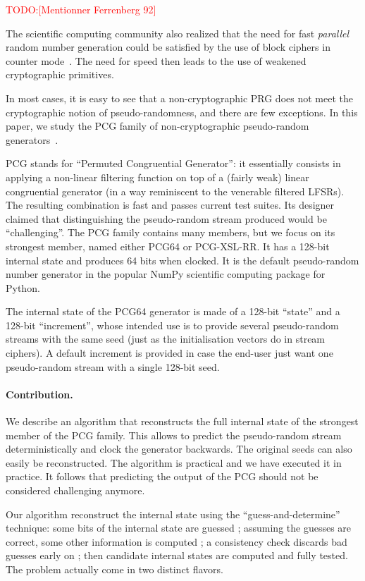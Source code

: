\documentclass[submission,svgnames,journal=tosc]{iacrtrans}
\newcommand{\todo}[1]{\textcolor{red}{TODO:[#1]}}
\begin{document}
\todo{Mentionner Ferrenberg 92}

The scientific computing community also realized that the need for fast
\emph{parallel} random number generation could be satisfied by the use of block
ciphers in counter mode~\cite{Salmon11}. The need for speed then leads to the
use of weakened cryptographic primitives.

In most cases, it is easy to see that a non-cryptographic PRG does not meet the
cryptographic notion of pseudo-randomness, and there are few exceptions. In this
paper, we study the \textsf{PCG} family of non-cryptographic pseudo-random
generators~\cite{melissapaper,melissaweb}.

\textsf{PCG} stands for ``Permuted Congruential Generator'': it essentially
consists in applying a non-linear filtering function on top of a (fairly weak)
linear congruential generator (in a way reminiscent to the venerable filtered
LFSRs). The resulting combination is fast and passes current test suites. Its
designer claimed that distinguishing the pseudo-random stream produced would be
``challenging''. The \textsf{PCG} family contains many members, but we focus on
its strongest member, named either \textsf{PCG64} or \textsf{PCG-XSL-RR}. It has
a 128-bit internal state and produces 64 bits when clocked. It is the default
pseudo-random number generator in the popular \textsf{NumPy} scientific
computing package for \textsf{Python}.

The internal state of the \textsf{PCG64} generator is made of a 128-bit
``state'' and a 128-bit ``increment'', whose intended use is to provide several
pseudo-random streams with the same seed (just as the initialisation vectors do
in stream ciphers). A default increment is provided in case the end-user just
want one pseudo-random stream with a single 128-bit seed.

\paragraph{Contribution.} We describe an algorithm that reconstructs the full
internal state of the strongest member of the \textsf{PCG} family. This allows
to predict the pseudo-random stream deterministically and clock the generator
backwards. The original seeds can also easily be reconstructed. The algorithm is
practical and we have executed it in practice. It follows that predicting the
output of the \textsf{PCG} should not be considered challenging anymore.

Our algorithm reconstruct the internal state using the ``guess-and-determine''
technique: some bits of the internal state are guessed ; assuming the guesses
are correct, some other information is computed ; a consistency check discards
bad guesses early on ; then candidate internal states are computed and fully
tested. The problem actually come in two distinct flavors.
\end{document}
